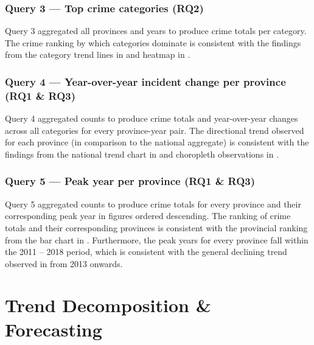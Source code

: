 \documentclass[titlepage, 12pt, oneside]{article}
\numberwithin{equation}{section}
\begin{document}
	\subsubsection*{Query 3 --- Top crime categories (RQ2)}
	Query 3 aggregated all provinces and years to produce crime totals per category. The crime ranking by which categories dominate is consistent with the findings from the category trend lines in  and heatmap in . 
	\subsubsection*{Query 4 --- Year-over-year incident change per province (RQ1 \& RQ3)}
	Query 4 aggregated counts to produce crime totals and year-over-year changes across all categories for every province-year pair. The directional trend observed for each province (in comparison to the national aggregate) is consistent with the findings from the national trend chart in  and choropleth observations in . 
	\subsubsection*{Query 5 --- Peak year per province (RQ1 \& RQ3)}
    Query 5 aggregated counts to produce crime totals for every province and their corresponding peak year in figures ordered descending. The ranking of crime totals and their corresponding provinces is consistent with the provincial ranking from the bar chart in . Furthermore, the peak years for every province fall within the 2011 -- 2018 period, which is consistent with the general declining trend observed in  from 2013 onwards.  
	
	\newpage
	\section{Trend Decomposition \& Forecasting}
	
\end{document}
